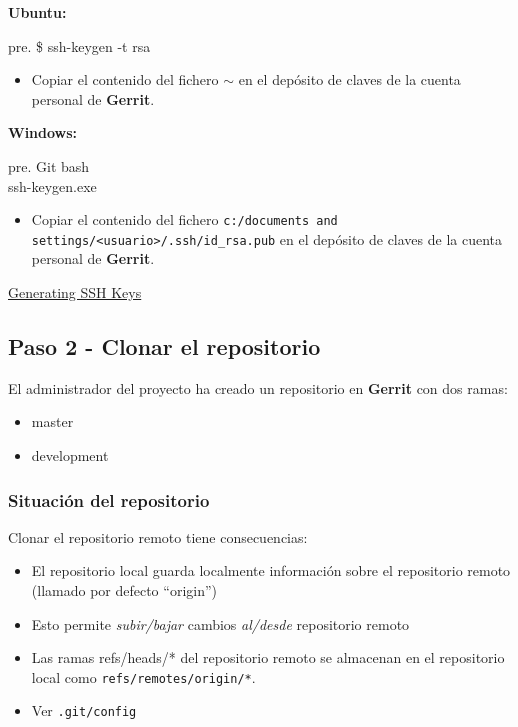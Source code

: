 \textbf{Ubuntu:}

pre. \$ ssh-keygen -t rsa

\begin{itemize}
\item
  Copiar el contenido del fichero \texttt{\ensuremath{\sim}} en el
  depósito de claves de la cuenta personal de \textbf{Gerrit}.
\end{itemize}
\textbf{Windows:}

pre. Git bash\\ssh-keygen.exe

\begin{itemize}
\item
  Copiar el contenido del fichero
  \texttt{c:/documents and settings/\textless{}usuario\textgreater{}/.ssh/id\_rsa.pub}
  en el depósito de claves de la cuenta personal de \textbf{Gerrit}.
\end{itemize}
\href{https://help.github.com/articles/generating-ssh-keys}{Generating
SSH Keys}

\subsection{Paso 2 - Clonar el repositorio}

El administrador del proyecto ha creado un repositorio en
\textbf{Gerrit} con dos ramas:

\begin{itemize}
\item
  master
\item
  development
\end{itemize}
\subsubsection{Situación del repositorio}

Clonar el repositorio remoto tiene consecuencias:

\begin{itemize}
\item
  El repositorio local guarda localmente información sobre el
  repositorio remoto (llamado por defecto ``origin'')
\item
  Esto permite \emph{subir/bajar} cambios \emph{al/desde} repositorio
  remoto
\item
  Las ramas refs/heads/* del repositorio remoto se almacenan en el
  repositorio local como \texttt{refs/remotes/origin/*}.
\item
  Ver \texttt{.git/config}
\end{itemize}
